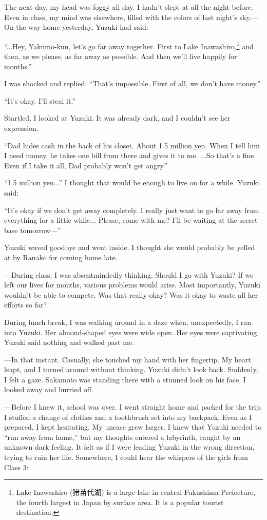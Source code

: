\documentclass[
    a4paper,
    12pt,
    twoside,
    openany,
    UTF8,
    fontset=windows
]{ctexbook}
\begin{document}
The next day, my head was foggy all day. I hadn't slept at all the night before. Even in class, my mind was elsewhere, filled with the colors of last night's sky.---On the way home yesterday, Yuzuki had said:

``...Hey, Yakumo-kun, let's go far away together. First to Lake Inawashiro,\footnote{Lake Inawashiro (猪苗代湖) is a large lake in central Fukushima Prefecture, the fourth largest in Japan by surface area. It is a popular tourist destination.} and then, as we please, as far away as possible. And then we'll live happily for months.''

I was shocked and replied: ``That's impossible. First of all, we don't have money.''

``It's okay. I'll steal it.''

Startled, I looked at Yuzuki. It was already dark, and I couldn't see her expression.

``Dad hides cash in the back of his closet. About 1.5 million yen. When I tell him I need money, he takes one bill from there and gives it to me. ...So that's a fine. Even if I take it all, Dad probably won't get angry.''

``1.5 million yen...'' I thought that would be enough to live on for a while. Yuzuki said:

``It's okay if we don't get away completely. I really just want to go far away from everything for a little while... Please, come with me? I'll be waiting at the secret base tomorrow---''

Yuzuki waved goodbye and went inside. I thought she would probably be yelled at by Ranako for coming home late.

---During class, I was absentmindedly thinking. Should I go with Yuzuki? If we left our lives for months, various problems would arise. Most importantly, Yuzuki wouldn't be able to compete. Was that really okay? Was it okay to waste all her efforts so far?

During lunch break, I was walking around in a daze when, unexpectedly, I ran into Yuzuki. Her almond-shaped eyes were wide open. Her eyes were captivating. Yuzuki said nothing and walked past me.

---In that instant. Casually, she touched my hand with her fingertip. My heart leapt, and I turned around without thinking. Yuzuki didn't look back. Suddenly, I felt a gaze. Sakamoto was standing there with a stunned look on his face. I looked away and hurried off.

---Before I knew it, school was over. I went straight home and packed for the trip. I stuffed a change of clothes and a toothbrush set into my backpack. Even as I prepared, I kept hesitating. My unease grew larger. I knew that Yuzuki needed to ``run away from home,'' but my thoughts entered a labyrinth, caught by an unknown dark feeling. It felt as if I were leading Yuzuki in the wrong direction, trying to ruin her life. Somewhere, I could hear the whispers of the girls from Class 3:
\end{document}
